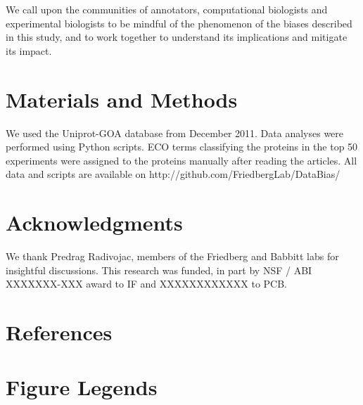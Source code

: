 \documentclass[12pt]{article}
\begin{document}
We call upon the communities of annotators, computational biologists and experimental biologists to
be mindful of the phenomenon of the biases described in this study, and to work together to
understand its implications and mitigate its impact.


\section*{Materials and Methods}
We used the Uniprot-GOA database from December 2011. Data analyses were performed using Python scripts.
ECO terms classifying the proteins in the top 50 experiments were assigned to the proteins
manually after reading the articles. All data and scripts are available on
http://github.com/FriedbergLab/DataBias/

\section*{Acknowledgments}
We thank Predrag Radivojac, members of the Friedberg and Babbitt labs for insightful discussions.
This research was funded, in part by NSF / ABI XXXXXXX-XXX award to IF and XXXXXXXXXXXX to PCB.

\section*{References}


\section*{Figure Legends}
\end{document}
